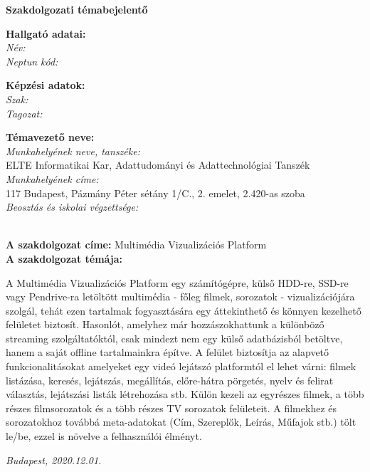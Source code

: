 
\thispagestyle{empty}
{\bf \huge {Szakdolgozati témabejelentő}}

\begin{flushleft}
    {\bf {Hallgató adatai:}}\\
    \> \> \> \> {\emph {Név: }} \authorname\\
    \> \> \> \> {\emph {Neptun kód: }} \neptuncode\\
    \vspace{0.3cm}

    {\bf {Képzési adatok:}}\\
    \> \> \> \> {\emph {Szak: }} \degreename\\
    \> \> \> \> {\emph {Tagozat: }} \studytype\\
    \vspace{0.3cm}

    {\bf {Témavezető neve:}} \supname\\
    \> \> \> \> {\emph {Munkahelyének neve, tanszéke: }}\\
    \> \> \> \> \> \> \> \> {\small {ELTE Informatikai Kar, Adattudományi és Adattechnológiai Tanszék}}\\
    \> \> \> \> {\emph {Munkahelyének címe: }}\\
    \> \> \> \> \> \> \> \> {\small {117 Budapest, Pázmány Péter sétány 1/C., 2. emelet, 2.420-as szoba}}\\
    \> \> \> \> {\emph {Beosztás és iskolai végzettsége: }} \\
    \> \> \> \> \> \> \> \> {\small \supaff}\\
\end{flushleft}

\vspace{0.5cm}

{\bf {A szakdolgozat címe:}} {Multimédia Vizualizációs Platform}\\
\vspace{1cm}
\> \> {\bf {A szakdolgozat témája:}}

A Multimédia Vizualizációs Platform egy számítógépre, külső HDD-re, SSD-re vagy Pendrive-ra letöltött multimédia - főleg filmek, sorozatok - vizualizációjára szolgál, tehát ezen tartalmak fogyasztására egy áttekinthető és könnyen kezelhető felületet biztosít. Hasonlót, amelyhez már hozzászokhattunk a különböző streaming szolgáltatóktól, csak mindezt nem egy külső adatbázisból betöltve, hanem a saját offline tartalmainkra építve. A felület biztosítja az alapvető funkcionalitásokat amelyeket egy videó lejátszó platformtól el lehet várni: filmek listázása, keresés, lejátszás, megállítás, előre-hátra pörgetés, nyelv és felirat választás, lejátszási listák létrehozása stb. Külön kezeli az egyrészes filmek, a több részes filmsorozatok és a több részes TV sorozatok felületeit. A filmekhez és sorozatokhoz továbbá meta-adatokat (Cím, Szereplők, Leírás, Műfajok stb.) tölt le/be, ezzel is növelve a felhasználói élményt.

\vspace{1cm}

{\it {Budapest}, {2020.12.01.}}
